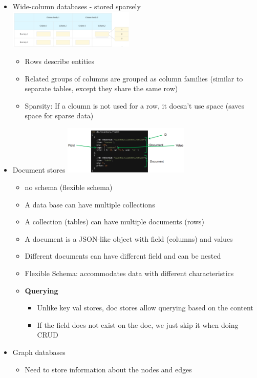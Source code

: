 \documentclass[10pt, landscape]{article}
\begin{document}
\begin{multicols}{4}
\begin{itemize}
  \item Wide-column databases - stored sparsely
  \includegraphics*[width=6cm]{wide_col} 
  \begin{itemize}
    \item Rows describe entities
    \item Related groups of columns are grouped as column families (similar to separate tables, except they share the same row)
    \item Sparsity: If a cloumn is not used for a row, it doesn't use space (saves space for sparse data)
  \end{itemize}
  \item Document stores 
  \includegraphics*[width=6cm]{doc_model}
  \begin{itemize}
    \item no schema (flexible schema)
    \item A data base can have multiple collections 
    \item A collection (tables) can have multiple documents (rows)
    \item A document is a JSON-like object with field (columns) and values 
    \item Different documents can have different field and can be nested 
    \item Flexible Schema: accommodates data with different characteristics  
    \item \textbf{Querying}
    \begin{itemize}
      \item Unlike key val stores, doc stores allow querying based on the content 
      \item If the field does not exist on the doc, we just skip it when doing CRUD
    \end{itemize}
  \end{itemize}
  \item Graph databases
  \begin{itemize}
    \item Need to store information about the nodes and edges

\end{itemize}
\end{itemize}
\end{multicols}
\end{document}
